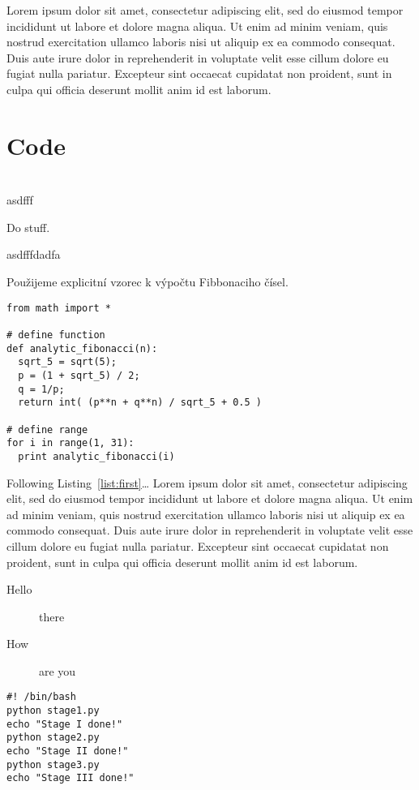 \documentclass{article}
\begin{document}
Lorem ipsum dolor sit amet, consectetur adipiscing elit, sed do eiusmod tempor
incididunt ut labore et dolore magna aliqua. Ut enim ad minim veniam, quis
nostrud exercitation ullamco laboris nisi ut aliquip ex ea commodo consequat.
Duis aute irure dolor in reprehenderit in voluptate velit esse cillum dolore eu
fugiat nulla pariatur. Excepteur sint occaecat cupidatat non proident, sunt in
culpa qui officia deserunt mollit anim id est laborum.


\section{Code}

\begin{algo}[asdf]\ \\
	\AlgIn asdfff
	\begin{algorithmic}[1]
		\State Do stuff.
	\end{algorithmic}
	\AlgOut asdfffdadfa
\end{algo}

\begin{algo} Použijeme explicitní vzorec k výpočtu
	Fibbonaciho čísel.
	\begin{lstlisting}[label={list:first}]
from math import *

# define function 
def analytic_fibonacci(n):
  sqrt_5 = sqrt(5);
  p = (1 + sqrt_5) / 2;
  q = 1/p;
  return int( (p**n + q**n) / sqrt_5 + 0.5 )
 
# define range
for i in range(1, 31):
  print analytic_fibonacci(i)
\end{lstlisting}
\end{algo}
Following Listing~\ref{list:first}\ldots{}
Lorem ipsum dolor sit amet, consectetur adipiscing elit, sed do eiusmod tempor
incididunt ut labore et dolore magna aliqua. Ut enim ad minim veniam, quis
nostrud exercitation ullamco laboris nisi ut aliquip ex ea commodo consequat.
Duis aute irure dolor in reprehenderit in voluptate velit esse cillum dolore eu
fugiat nulla pariatur. Excepteur sint occaecat cupidatat non proident, sunt in
culpa qui officia deserunt mollit anim id est laborum.

\begin{description}
	\item[Hello] there
	\item[How] are you
\end{description}

\begin{lstlisting}[label={list:second},caption=Sample Bash code.]
#! /bin/bash
python stage1.py
echo "Stage I done!"
python stage2.py
echo "Stage II done!"
python stage3.py
echo "Stage III done!"
\end{lstlisting}
\end{document}
